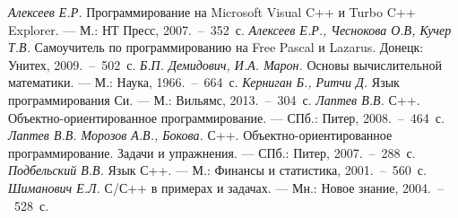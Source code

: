 \begin{thebibliography}{9}
 \emph{Алексеев Е.Р.} Программирование на Microsoft Visual C++ и Turbo C++ Explorer. --- М.: НТ Пресс, 2007.~--~352~с. 
 \emph{Алексеев Е.Р., Чеснокова О.В, Кучер Т.В.} Самоучитель по программированию на Free Pascal и Lazarus. Донецк: Унитех, 2009.~--~502~с. 
 \emph{Б.П. Демидович, И.А. Марон.} Основы вычислительной математики. --- М.: Наука, 1966.~--~664~с.
 \emph{Керниган Б., Ритчи Д.} Язык программирования Си. ---  М.: Вильямс, 2013.~--~304~с.
 \emph{Лаптев В.В.} С++. Объектно-ориентированное программирование. --- СПб.: Питер, 2008.~--~464~с.
 \emph{Лаптев В.В. Морозов А.В., Бокова.} С++. Объектно-ориентированное программирование. Задачи и упражнения. --- СПб.: Питер, 2007.~--~288~с.
 \emph{Подбельский В.В.} Язык С++. --- М.: Финансы и статистика, 2001.~--~560~с.
 \emph{Шиманович Е.Л.} С/С++ в примерах и задачах. --- Мн.: Новое знание, 2004.~--~528~с.
\end{thebibliography}
